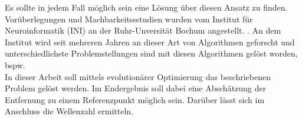 Es sollte in jedem Fall möglich sein eine Lösung über diesen Ansatz zu finden. Vorüberlegungen und Machbarkeitssstudien wurden vom Institut für Neuroinformatik (INI) an der Ruhr-Unversität Bochum angestellt. \cite{Wil1,Muz1}. An dem Institut wird seit mehreren Jahren an dieser Art von Algorithmen geforscht und unterschiedlichste Problemstellungen sind mit diesen Algorithmen gelöst worden, bspw.~\cite{DBLP:conf/bildmed/RitschelDW12, DBLP:conf/bildmed/WinterRBD10}\\
%

In dieser Arbeit soll mittels evolutionärer Optimierung das beschriebenen Problem gelöst werden. Im Endergebnis soll dabei eine Abschätzung der Entfernung zu einem Referenzpunkt möglich sein. Darüber lässt sich im Anschluss die Wellenzahl ermitteln.
